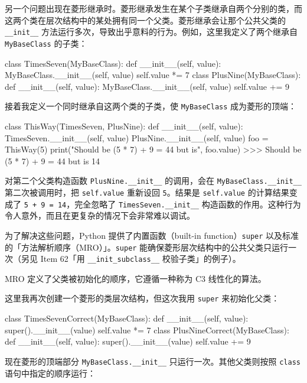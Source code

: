 另一个问题出现在菱形继承时。菱形继承发生在某个子类继承自两个分别的类，而这两个类在层次结构中的某处拥有同一个父类。菱形继承会让那个公共父类的 \texttt{\_\_init\_\_} 方法运行多次，导致出乎意料的行为。例如，这里我定义了两个继承自 \texttt{MyBaseClass} 的子类：

\begin{codebox}[python]
class TimesSeven(MyBaseClass):
    def __init__(self, value):
        MyBaseClass.__init__(self, value)
        self.value *= 7
class PlusNine(MyBaseClass):
    def __init__(self, value):
        MyBaseClass.__init__(self, value)
        self.value += 9
\end{codebox}

接着我定义一个同时继承自这两个类的子类，使 \texttt{MyBaseClass} 成为菱形的顶端：

\begin{codebox}[python]
class ThisWay(TimesSeven, PlusNine):
    def __init__(self, value):
        TimesSeven.__init__(self, value)
        PlusNine.__init__(self, value)
foo = ThisWay(5)
print("Should be (5 * 7) + 9 = 44 but is", foo.value)
>>>
Should be (5 * 7) + 9 = 44 but is 14
\end{codebox}

对第二个父类构造函数 \texttt{PlusNine.\_\_init\_\_} 的调用，会在 \texttt{MyBaseClass.\_\_init\_\_} 第二次被调用时，把 \texttt{self.value} 重新设回 \texttt{5}。结果是 \texttt{self.value} 的计算结果变成了 \texttt{5 + 9 = 14}，完全忽略了 \texttt{TimesSeven.\_\_init\_\_} 构造函数的作用。这种行为令人意外，而且在更复杂的情况下会非常难以调试。

为了解决这些问题，Python 提供了内置函数（built-in function）\texttt{super} 以及标准的「方法解析顺序（MRO）」。\texttt{super} 能确保菱形层次结构中的公共父类只运行一次（另见 Item 62「用 \texttt{\_\_init\_subclass\_\_} 校验子类」的例子）。

MRO 定义了父类被初始化的顺序，它遵循一种称为 C3 线性化的算法。

这里我再次创建一个菱形的类层次结构，但这次我用 \texttt{super} 来初始化父类：

\begin{codebox}[python]
class TimesSevenCorrect(MyBaseClass):
    def __init__(self, value):
        super().__init__(value)
        self.value *= 7
class PlusNineCorrect(MyBaseClass):
    def __init__(self, value):
        super().__init__(value)
        self.value += 9
\end{codebox}

现在菱形的顶端部分 \texttt{MyBaseClass.\_\_init\_\_} 只运行一次。其他父类则按照 \texttt{class} 语句中指定的顺序运行：

